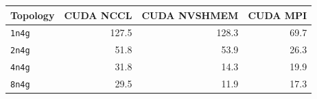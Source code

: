 \begin{tabular}{lrrr}
\toprule
Topology & CUDA NCCL & CUDA NVSHMEM & CUDA MPI\\
\midrule
\texttt{1n4g} & 127.5 & 128.3 & 69.7\\
\texttt{2n4g} & 51.8 & 53.9 & 26.3\\
\texttt{4n4g} & 31.8 & 14.3 & 19.9\\
\texttt{8n4g} & 29.5 & 11.9 & 17.3\\
\bottomrule
\end{tabular}
